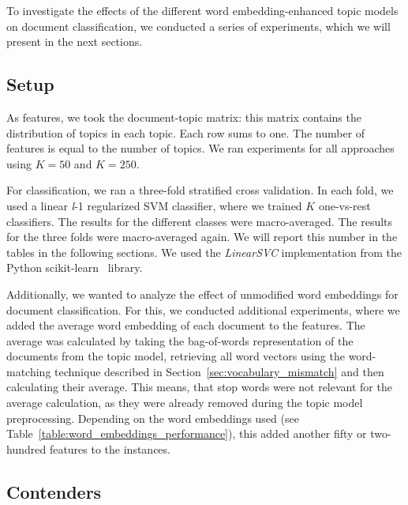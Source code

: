 \documentclass[
        a4paper,
        titlepage,
        twoside,
        parskip
        ]{scrbook}
\theoremstyle{break}
\begin{document}
To investigate the effects of the different word embedding-enhanced topic models on document classification, we conducted a series of experiments, which we will present in the next sections.

\subsection{Setup}

As features, we took the document-topic matrix: this matrix contains the distribution of topics in each topic.
Each row sums to one.
The number of features is equal to the number of topics.
We ran experiments for all approaches using $K = 50$ and $K = 250$.

For classification, we ran a three-fold stratified cross validation.
In each fold, we used a linear \emph{l}-1 regularized SVM classifier, where we trained $K$ one-vs-rest classifiers.
The results for the different classes were macro-averaged.
The results for the three folds were macro-averaged again.
We will report this number in the tables in the following sections.
We used the \emph{LinearSVC} implementation from the Python scikit-learn~\cite{Pedregosa2012} library.

Additionally, we wanted to analyze the effect of unmodified word embeddings for document classification.
For this, we conducted additional experiments, where we added the average word embedding of each document to the features.
The average was calculated by taking the bag-of-words representation of the documents from the topic model, retrieving all word vectors using the word-matching technique described in Section~\ref{sec:vocabulary_mismatch} and then calculating their average.
This means, that stop words were not relevant for the average calculation, as they were already removed during the topic model preprocessing.
Depending on the word embeddings used (see Table~\ref{table:word_embeddings_performance}), this added another fifty or two-hundred features to the instances.

\subsection{Contenders}
\end{document}
